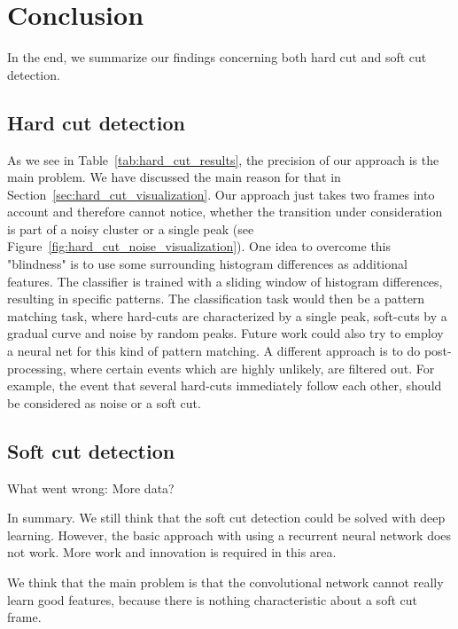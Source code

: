 \section{Conclusion}
\label{sec:conclusion}
In the end, we summarize our findings concerning both hard cut and soft cut detection.

\subsection{Hard cut detection}
\label{sec:conclusion_hard_cut}

As we see in Table~\ref{tab:hard_cut_results}, the precision of our approach is the main problem. 
We have discussed the main reason for that in Section~\ref{sec:hard_cut_visualization}.
Our approach just takes two frames into account and therefore cannot notice, whether the transition under consideration is part of a noisy cluster or a single peak (see Figure~\ref{fig:hard_cut_noise_visualization}).
One idea to overcome this "blindness" is to use some surrounding histogram differences as additional features. The classifier is trained with a sliding window of histogram differences, resulting in specific patterns. The classification task would then be a pattern matching task, where hard-cuts are characterized by a single peak, soft-cuts by a gradual curve and noise by random peaks. Future work could also try to employ a neural net for this kind of pattern matching.
A different approach is to do post-processing, where certain events which are highly unlikely, are filtered out. For example, the event that several hard-cuts immediately follow each other, should be considered as noise or a soft cut. 

\subsection{Soft cut detection}
\label{sec:conclusion_hard_cut}

What went wrong:
More data?

In summary.
We still think that the soft cut detection could be solved with deep learning.
However, the basic approach with using a recurrent neural network does not work.
More work and innovation is required in this area.

We think that the main problem is that the convolutional network cannot really learn good features, because there is nothing characteristic about a soft cut frame.
